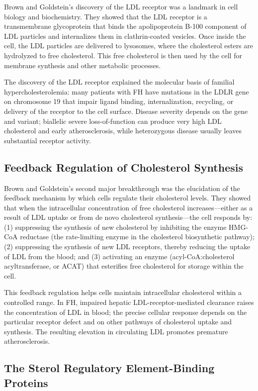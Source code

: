 Brown and Goldstein's discovery of the LDL receptor was a landmark in cell biology and biochemistry. They showed that the LDL receptor is a transmembrane glycoprotein that binds the apolipoprotein B-100 component of LDL particles and internalizes them in clathrin-coated vesicles. Once inside the cell, the LDL particles are delivered to lysosomes, where the cholesterol esters are hydrolyzed to free cholesterol. This free cholesterol is then used by the cell for membrane synthesis and other metabolic processes.

The discovery of the LDL receptor explained the molecular basis of familial hypercholesterolemia: many patients with FH have mutations in the LDLR gene on chromosome 19 that impair ligand binding, internalization, recycling, or delivery of the receptor to the cell surface. Disease severity depends on the gene and variant; biallelic severe loss-of-function can produce very high LDL cholesterol and early atherosclerosis, while heterozygous disease usually leaves substantial receptor activity.

\subsection{Feedback Regulation of Cholesterol Synthesis}

Brown and Goldstein's second major breakthrough was the elucidation of the feedback mechanism by which cells regulate their cholesterol levels. They showed that when the intracellular concentration of free cholesterol increases---either as a result of LDL uptake or from de novo cholesterol synthesis---the cell responds by: (1) suppressing the synthesis of new cholesterol by inhibiting the enzyme HMG-CoA reductase (the rate-limiting enzyme in the cholesterol biosynthetic pathway); (2) suppressing the synthesis of new LDL receptors, thereby reducing the uptake of LDL from the blood; and (3) activating an enzyme (acyl-CoA:cholesterol acyltransferase, or ACAT) that esterifies free cholesterol for storage within the cell.

This feedback regulation helps cells maintain intracellular cholesterol within a controlled range. In FH, impaired hepatic LDL-receptor-mediated clearance raises the concentration of LDL in blood; the precise cellular response depends on the particular receptor defect and on other pathways of cholesterol uptake and synthesis. The resulting elevation in circulating LDL promotes premature atherosclerosis.

\subsection{The Sterol Regulatory Element-Binding Proteins}

